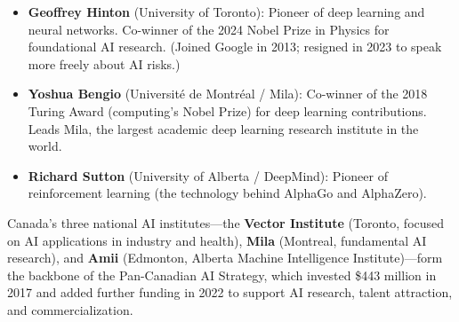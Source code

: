 \begin{itemize}
  \item \textbf{Geoffrey Hinton} (University of Toronto): Pioneer of deep learning and neural networks. Co-winner of the 2024 Nobel Prize in Physics for foundational AI research. (Joined Google in 2013; resigned in 2023 to speak more freely about AI risks.)
  \item \textbf{Yoshua Bengio} (Université de Montréal / Mila): Co-winner of the 2018 Turing Award (computing's Nobel Prize) for deep learning contributions. Leads Mila, the largest academic deep learning research institute in the world.
  \item \textbf{Richard Sutton} (University of Alberta / DeepMind): Pioneer of reinforcement learning (the technology behind AlphaGo and AlphaZero).
\end{itemize}

Canada's three national AI institutes---the \textbf{Vector Institute} (Toronto, focused on AI applications in industry and health), \textbf{Mila} (Montreal, fundamental AI research), and \textbf{Amii} (Edmonton, Alberta Machine Intelligence Institute)---form the backbone of the Pan-Canadian AI Strategy, which invested \$443 million in 2017 and added further funding in 2022 to support AI research, talent attraction, and commercialization.

